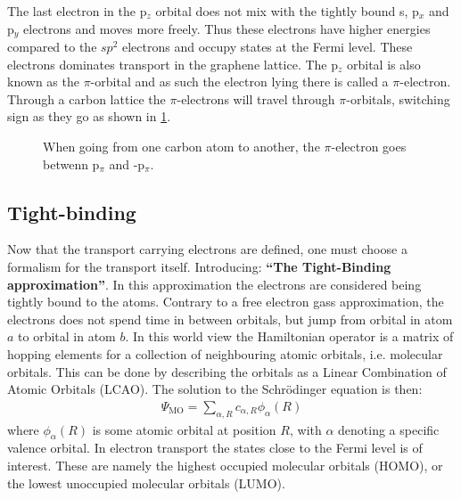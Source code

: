 The last electron in the p\(_z\) orbital does not mix with the tightly bound s, p\(_x\) and p\(_y\) electrons and moves more freely. Thus these electrons have higher energies compared to the \(sp^2\) electrons and occupy states at the Fermi level. These electrons dominates transport in the graphene lattice. The p\(_z\) orbital is also known as the \(\pi\)-orbital and as such the electron lying there is called a \(\pi\)-electron. Through a carbon lattice the \(\pi\)-electrons will travel through \(\pi\)-orbitals, switching sign as they go as shown in \cref{sign}.
\begin{figure}[H]
	\begin{center}
		\caption{When going from one carbon atom to another, the \(\pi\)-electron goes betwenn p\(_\pi\) and -p\(_\pi\).}
		\label{sign}
	\end{center}
\end{figure}
\subsection{Tight-binding}
Now that the transport carrying electrons are defined, one must choose a formalism for the transport itself. Introducing: \textbf{``The Tight-Binding approximation''}.
In this approximation the electrons are considered being tightly bound to the atoms. Contrary to a free electron gass approximation, the electrons does not spend time in between orbitals, but jump from orbital in atom \(a\) to orbital in atom \(b\). In this world view the Hamiltonian operator is a matrix of hopping elements for a collection of neighbouring atomic orbitals, i.e. molecular orbitals. This can be done by describing the orbitals as a Linear Combination of Atomic Orbitals (LCAO). The solution to the Schrödinger equation is then:
\begin{align}
	\Psi_{\mathrm{MO}} = \sum_{\alpha,R}c_{\alpha,R}\phi_{\alpha}(R)
\end{align}
where \(\phi_{\alpha}(R)\) is some atomic orbital at position \(R\), with \(\alpha\) denoting a specific valence orbital. In electron transport the states close to the Fermi level is of interest. These are namely the highest occupied molecular orbitals (HOMO), or the lowest unoccupied molecular orbitals (LUMO).
